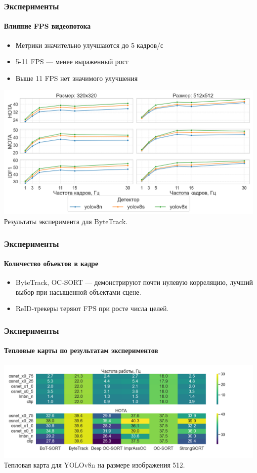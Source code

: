 \documentclass{beamer} %
\begin{document}
\begin{frame}
  \frametitle{Эксперименты}
  \framesubtitle{Влияние FPS видеопотока}
  \begin{itemize}
    \item Метрики значительно улучшаются до 5 кадров/с
    \item 5-11 FPS — менее выраженный рост
    \item Выше 11 FPS нет значимого улучшения
  \end{itemize}
  \centering
  \includegraphics[width=0.7\linewidth]{images/plots/fps_vs_metric/ByteTrack.png}\\
  \small Результаты эксперимента для ByteTrack.
\end{frame}

\begin{frame}
  \frametitle{Эксперименты}
  \framesubtitle{Количество объектов в кадре}
  
  \begin{itemize}
    \item ByteTrack, OC-SORT — демонстрируют почти нулевую корреляцию, лучший выбор при насыщенной объектами сцене.
    \item ReID-трекеры теряют FPS при росте числа целей.
  \end{itemize}

\end{frame}

\begin{frame}
  \frametitle{Эксперименты}
  \framesubtitle{Тепловые карты по результатам экспериментов}
  \centering
  \includegraphics[width=\linewidth]{images/plots/heatmap_fps_hota_vs_tracker_reid/heatmap_fps_hota_yolov8n_size512.png}\\
  \small Тепловая карта для YOLOv8n на размере изображения 512.
\end{frame}
\end{document}
